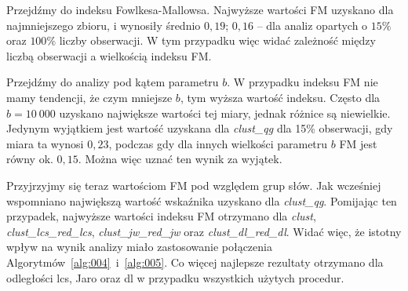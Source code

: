 \documentclass{praca1}
\begin{document}
Przejdźmy do indeksu Fowlkesa-Mallowsa. Najwyższe wartości FM uzyskano dla najmniejszego zbioru, i wynosiły średnio $0,19$; $0,16$ -- dla analiz opartych o $15\%$ oraz $100\%$ liczby obserwacji. W tym przypadku więc widać zależność między liczbą obserwacji a wielkością indeksu FM.


Przejdźmy do analizy pod kątem parametru $b$. W przypadku indeksu FM nie mamy tendencji, że czym mniejsze $b$, tym wyższa wartość indeksu. Często dla $b=10\ 000$ uzyskano największe wartości tej miary, jednak różnice są niewielkie. Jedynym wyjątkiem jest wartość uzyskana dla \emph{clust\_qg} dla 15\% obserwacji, gdy miara ta wynosi $0,23$, podczas gdy dla innych wielkości parametru $b$ FM jest równy ok. $0,15$. Można więc uznać ten wynik za wyjątek.


Przyjrzyjmy się teraz wartościom FM pod względem grup słów. Jak wcześniej wspomniano największą wartość wskaźnika uzyskano dla \emph{clust\_qg}. Pomijając ten przypadek, najwyższe wartości indeksu FM otrzymano dla \emph{clust}, \emph{clust\_lcs\_red\_lcs}, \emph{clust\_jw\_red\_jw} oraz \emph{clust\_dl\_red\_dl}. Widać więc, że istotny wpływ na wynik analizy miało zastosowanie połączenia Algorytmów~\ref{alg:004}~i~\ref{alg:005}. Co więcej najlepsze rezultaty otrzymano dla odległości lcs, Jaro oraz dl w przypadku wszystkich użytych procedur.

\end{document}
